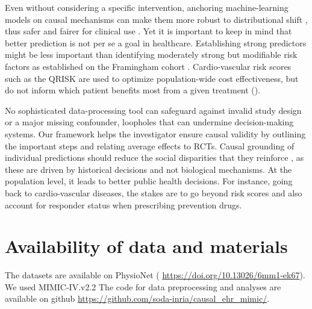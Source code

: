 \documentclass[10pt,letterpaper]{article}
\begin{document}
Even without considering a specific intervention, anchoring
machine-learning models on
causal mechanisms can make them more robust to distributional shift \cite{scholkopf2021toward},
thus safer and fairer for clinical use
\cite{richens2020improving,plecko2022causal}.
%
Yet it is important to keep in mind that better prediction is not per se
a goal in healthcare.
%
Establishing strong predictors might be less important than identifying
moderately strong but modifiable risk factors as established on the Framingham
cohort \cite{brand1976multivariate}.
Cardio-vascular risk scores such as the QRISK are used to optimize
population-wide cost
effectiveness, but do not inform which patient benefits most from a given
treatment ().

No sophisticated data-processing tool can safeguard against
invalid study design or a major missing confounder, loopholes that can
undermine decision-making systems. Our framework helps the investigator
ensure
causal validity by outlining the important steps and relating average effects to
RCTs. Causal grounding of individual predictions should reduce the social
disparities that they reinforce
\cite{rajkomar2018ensuring,mitra2022future,ehrmann2023making}, as these are driven by
historical decisions and not biological mechanisms. At the population
level, it leads to better public health decisions. For instance, going
back to cardio-vascular diseases, the stakes are to go beyond risk
scores and also account for responder status when prescribing prevention
drugs.


\section*{Availability of data and materials}

The datasets are available on PhysioNet (
\url{https://doi.org/10.13026/6mm1-ek67}). We used MIMIC-IV.v2.2 The code for
data preprocessing and analyses are available on github
\url{https://github.com/soda-inria/causal_ehr_mimic/}.

\end{document}
